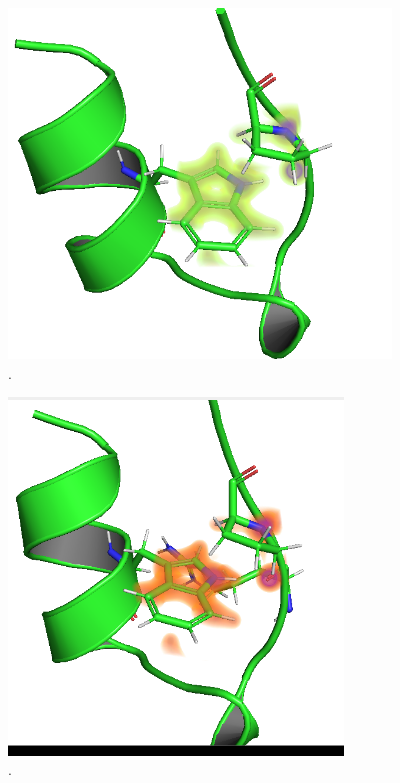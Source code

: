 \documentclass[a4paper,11pt]{refart}
\begin{document}
\hspace*{-\leftmarginwidth}
\begin{minipage}{\fullwidth}
	\begin{figure}[H]
		\begin{center}
			\includegraphics[width=4in]{images/tut3_img26}
			\caption{.}
			\label{fig_tut3_25}
		\end{center}
	\end{figure}
\end{minipage}

\hspace*{-\leftmarginwidth}
\begin{minipage}{\fullwidth}
	\begin{figure}[H]
		\begin{center}
			\includegraphics[width=3.5in]{images/tut3_img27}
			\caption{.}
			\label{fig_tut3_26}
		\end{center}
	\end{figure}
\end{minipage}
\end{document}
